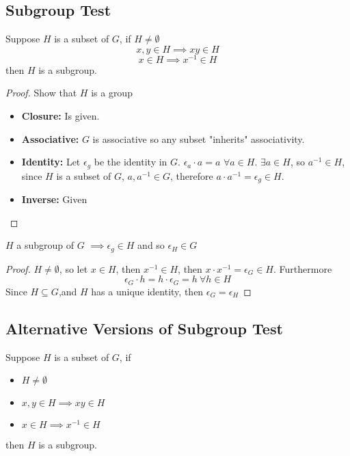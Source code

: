 \documentclass[openany]{report}
\begin{document}
\subsection{Subgroup Test}
\begin{prop}
Suppose $H$ is a subset of $G$, if $H \neq \emptyset$
$$x,y \in H \implies xy \in H$$
$$x \in H \implies x^{-1} \in H$$
then $H$ is a subgroup.
\end{prop}
\begin{proof}
    Show that $H$ is a group
    \begin{itemize}
        \item \textbf{Closure:} Is given.
        \item \textbf{Associative:} $G$ is associative so any subset "inherits" associativity.
        \item \textbf{Identity:} Let $\epsilon_g$ be the identity in $G$. $\epsilon_a \cdot a  = a$ $\forall a \in H$. $\exists a \in H$, so $a^{-1} \in H$, since $H$ is a subset of $G$, $a, a^{-1} \in G$, therefore $a \cdot a^{-1} = \epsilon_g \in H$.
        \item \textbf{Inverse:} Given
    \end{itemize}
\end{proof}

\begin{prop}
    $H$ a subgroup of $G$ $\implies \epsilon_g \in H$ and so $\epsilon_H \in G$
\end{prop}
\begin{proof}
    $H \neq \emptyset$, so let $x \in H$, then $x^{-1} \in H$, then $x \cdot x^{-1} = \epsilon_G \in H$. Furthermore
    $$\epsilon_G \cdot h = h \cdot \epsilon_G = h \ \forall h \in H$$
    Since $H \subseteq G$,and $H$ has a unique identity, then $\epsilon_G = \epsilon_H$
\end{proof}
\subsection{Alternative Versions of Subgroup Test}
Suppose $H$ is a subset of $G$, if
\begin{itemize}
    \item  $H \neq \emptyset$
    \item $x,y \in H \implies xy \in H$
    \item $x \in H \implies x^{-1} \in H$
\end{itemize}
then $H$ is a subgroup.
\end{document}

